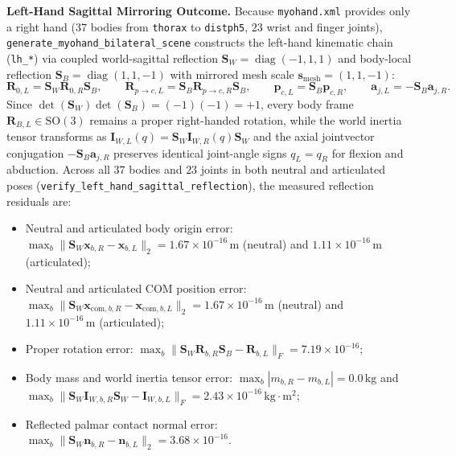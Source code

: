 \documentclass[11pt,a4paper]{article}
\begin{document}
\textbf{Left-Hand Sagittal Mirroring Outcome.}
Because \texttt{myohand.xml} provides only a right hand ($37$ bodies from \texttt{thorax} to \texttt{distph5}, $23$ wrist and finger joints), \texttt{generate\_myohand\_bilateral\_scene} constructs the left-hand kinematic chain (\texttt{lh\_*}) via coupled world-sagittal reflection $\mathbf{S}_W = \operatorname{diag}(-1, 1, 1)$ and body-local reflection $\mathbf{S}_B = \operatorname{diag}(1, 1, -1)$ with mirrored mesh scale $\mathbf{s}_{\mathrm{mesh}} = (1, 1, -1)$:
\begin{equation}
  \mathbf{R}_{0,L} = \mathbf{S}_W \mathbf{R}_{0,R} \mathbf{S}_B, \qquad
  \mathbf{R}_{p\to c,L} = \mathbf{S}_B \mathbf{R}_{p\to c,R} \mathbf{S}_B, \qquad
  \mathbf{p}_{c,L} = \mathbf{S}_B \mathbf{p}_{c,R}, \qquad
  \mathbf{a}_{j,L} = -\mathbf{S}_B \mathbf{a}_{j,R}.
\end{equation}
Since $\det(\mathbf{S}_W)\det(\mathbf{S}_B) = (-1)(-1) = +1$, every body frame $\mathbf{R}_{B,L} \in \mathrm{SO}(3)$ remains a proper right-handed rotation, while the world inertia tensor transforms as $\mathbf{I}_{W,L}(q) = \mathbf{S}_W \mathbf{I}_{W,R}(q) \mathbf{S}_W$ and the axial jointvector conjugation $-\mathbf{S}_B \mathbf{a}_{j,R}$ preserves identical joint-angle signs $q_L = q_R$ for flexion and abduction. Across all $37$ bodies and $23$ joints in both neutral and articulated poses (\texttt{verify\_left\_hand\_sagittal\_reflection}), the measured reflection residuals are:
\begin{itemize}
  \item Neutral and articulated body origin error: $\max_b \|\mathbf{S}_W \mathbf{x}_{b,R} - \mathbf{x}_{b,L}\|_2 = 1.67 \times 10^{-16}\,\mathrm{m}$ (neutral) and $1.11 \times 10^{-16}\,\mathrm{m}$ (articulated);
  \item Neutral and articulated COM position error: $\max_b \|\mathbf{S}_W \mathbf{x}_{\mathrm{com},b,R} - \mathbf{x}_{\mathrm{com},b,L}\|_2 = 1.67 \times 10^{-16}\,\mathrm{m}$ (neutral) and $1.11 \times 10^{-16}\,\mathrm{m}$ (articulated);
  \item Proper rotation error: $\max_b \|\mathbf{S}_W \mathbf{R}_{b,R} \mathbf{S}_B - \mathbf{R}_{b,L}\|_F = 7.19 \times 10^{-16}$;
  \item Body mass and world inertia tensor error: $\max_b |m_{b,R} - m_{b,L}| = 0.0\,\mathrm{kg}$ and $\max_b \|\mathbf{S}_W \mathbf{I}_{W,b,R} \mathbf{S}_W - \mathbf{I}_{W,b,L}\|_F = 2.43 \times 10^{-16}\,\mathrm{kg\cdot m^2}$;
  \item Reflected palmar contact normal error: $\max_b \|\mathbf{S}_W \mathbf{n}_{b,R} - \mathbf{n}_{b,L}\|_2 = 3.68 \times 10^{-16}$.
\end{itemize}
\end{document}
